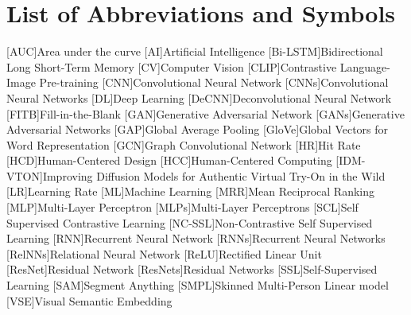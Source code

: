 \documentclass[a4paper,12pt,twoside]{scrreprt}
\begin{document}
\newpage


\newpage


\cleardoublepage
\tableofcontents

\clearpage
{}
{}
\listoffigures

\clearpage
{}
{}
\listoftables

\clearpage
{}
{}
\chapter*{List of Abbreviations and Symbols}
\begin{acronym}[ML]
 [AUC]{Area under the curve}
 [AI]{Artificial Intelligence}
 [Bi-LSTM]{Bidirectional Long Short-Term Memory}
 [CV]{Computer Vision}
 [CLIP]{Contrastive Language-Image Pre-training}
 [CNN]{Convolutional Neural Network}
 [CNNs]{Convolutional Neural Networks}
 [DL]{Deep Learning}
 [DeCNN]{Deconvolutional Neural Network}
 [FITB]{Fill-in-the-Blank}
 [GAN]{Generative Adversarial Network}
 [GANs]{Generative Adversarial Networks}
 [GAP]{Global Average Pooling}
 [GloVe]{Global Vectors for Word Representation}
 [GCN]{Graph Convolutional Network}
 [HR]{Hit Rate}
 [HCD]{Human-Centered Design}
 [HCC]{Human-Centered Computing}
 [IDM-VTON]{Improving Diffusion Models for Authentic Virtual Try-On in the Wild}
 [LR]{Learning Rate}
 [ML]{Machine Learning}
 [MRR]{Mean Reciprocal Ranking}
 [MLP]{Multi-Layer Perceptron}
 [MLPs]{Multi-Layer Perceptrons}
 [SCL]{Self Supervised Contrastive Learning}
 [NC-SSL]{Non-Contrastive Self Supervised Learning}
 [RNN]{Recurrent Neural Network}
 [RNNs]{Recurrent Neural Networks}
 [RelNNs]{Relational Neural Network}
 [ReLU]{Rectified Linear Unit}
 [ResNet]{Residual Network}
 [ResNets]{Residual Networks}
 [SSL]{Self-Supervised Learning}
 [SAM]{Segment Anything}
 [SMPL]{Skinned Multi-Person Linear model}
 [VSE]{Visual Semantic Embedding}
\end{acronym}
\end{document}
